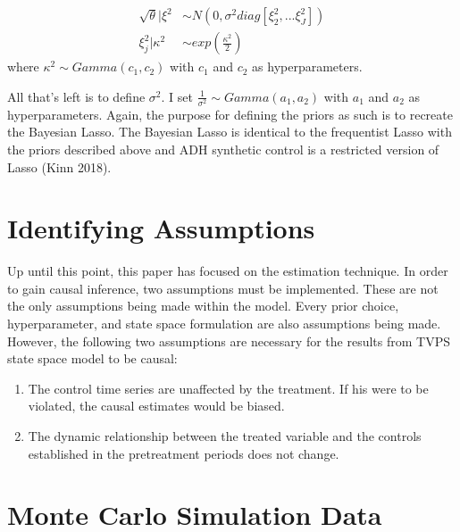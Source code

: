 \documentclass[
]{article}
\begin{document}
\[
\begin{aligned}
\sqrt{\theta} | \xi^2 &\sim N(0, \sigma^2 diag[\xi_2^2,...\xi_J^2])\\
\xi_j^2 | \kappa^2 &\sim exp\left(\frac{\kappa^2}{2}\right)
\end{aligned}
\] where \(\kappa^2 \sim Gamma(c_1,c_2)\) with \(c_1\) and \(c_2\) as
hyperparameters.

All that's left is to define \(\sigma^2\). I set
\(\frac{1}{\sigma^2} \sim Gamma(a_1,a_2)\) with \(a_1\) and \(a_2\) as
hyperparameters. Again, the purpose for defining the priors as such is
to recreate the Bayesian Lasso. The Bayesian Lasso is identical to the
frequentist Lasso with the priors described above and ADH synthetic
control is a restricted version of Lasso (Kinn 2018).

\hypertarget{identifying-assumptions}{%
\section{Identifying Assumptions}\label{identifying-assumptions}}

Up until this point, this paper has focused on the estimation technique.
In order to gain causal inference, two assumptions must be implemented.
These are not the only assumptions being made within the model. Every
prior choice, hyperparameter, and state space formulation are also
assumptions being made. However, the following two assumptions are
necessary for the results from TVPS state space model to be causal:

\begin{enumerate}
\def\labelenumi{\roman{enumi})}
\item
  The control time series are unaffected by the treatment. If his were
  to be violated, the causal estimates would be biased.
\item
  The dynamic relationship between the treated variable and the controls
  established in the pretreatment periods does not change.
\end{enumerate}

\hypertarget{monte-carlo-simulation-data}{%
\section{Monte Carlo Simulation
Data}\label{monte-carlo-simulation-data}}
\end{document}
